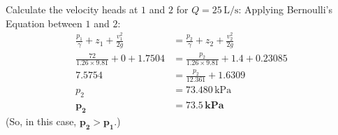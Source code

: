 \documentclass[10pt]{amsart}
\begin{document}
\begin{minipage}[t]{0.52\textwidth}
	\parb
	Calculate the velocity heads at $1$ and $2$ for $Q=25\,\text{L/s}$:
	\parb
	Applying Bernoulli's Equation between $1$ and $2$:
	\begin{align*}
		\frac{p_1}{\gamma} + z_1 + \frac{v_1^2}{2g} & = \frac{p_2}{\gamma} + z_2 + \frac{v_2^2}{2g} \\
		\frac{72}{1.26\times9.81} + 0 + 1.7504      & = \frac{p_2}{1.26\times9.81} + 1.4 + 0.23085  \\
		7.5754                                      & = \frac{p_2}{12.361} + 1.6309                 \\
		p_2                                         & = 73.480\,\text{kPa}                          \\
		\bm{p_2}                                    & \bm{= 73.5\,\textbf{kPa}}                     
	\end{align*}
	\parb
	\centering
	(So, in this case, $\bm{p_2>p_1}$.)
	
\end{minipage}

\end{document}
